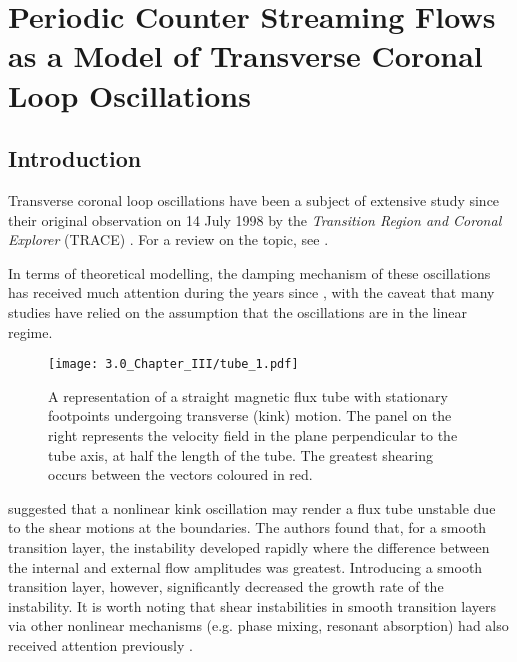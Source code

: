 \documentclass[12pt]{ociamthesis}
\begin{document}
\baselineskip=18pt

\setcounter{secnumdepth}{3}
\setcounter{tocdepth}{3}

\setcounter{chapter}{2}
\chapter{Periodic Counter Streaming Flows as a Model of Transverse Coronal Loop Oscillations}


\section{Introduction}

Transverse coronal loop oscillations have been a subject of extensive study since their original observation on 14 July 1998 by the \textit{Transition Region and Coronal Explorer} (TRACE) \citep{Aschwanden1999, Nakariakov1999}.
For a review on the topic, see \cite{Ruderman2009}.

In terms of theoretical modelling, the damping mechanism of these oscillations has received much attention during the years since \citep[see, for example,][]{Ruderman2002, TVD2004, Williamson2014}, with the caveat that many studies have relied on the assumption that the oscillations are in the linear regime.

\begin{figure*}[t]
\centering
 \texttt{[image: 3.0\_Chapter\_III/tube\_1.pdf]}
 \caption{A representation of a straight magnetic flux tube with stationary footpoints undergoing transverse (kink) motion. The panel on the right represents the velocity field in the plane perpendicular to the tube axis, at half the length of the tube. The greatest shearing occurs between the vectors coloured in red.}
 \label{tube1}
\end{figure*}

\cite{Terradas2008} suggested that a nonlinear kink oscillation may render a flux tube unstable due to the shear motions at the boundaries.
The authors found that, for a smooth transition layer, the instability developed rapidly where the difference between the internal and external flow amplitudes was greatest.
Introducing a smooth transition layer, however, significantly decreased the growth rate of the instability.
It is worth noting that shear instabilities in smooth transition layers via other nonlinear mechanisms (e.g. phase mixing, resonant absorption) had also received attention previously \citep[see, for example,][]{Ofman1994,Poedts1997}.
\end{document}
